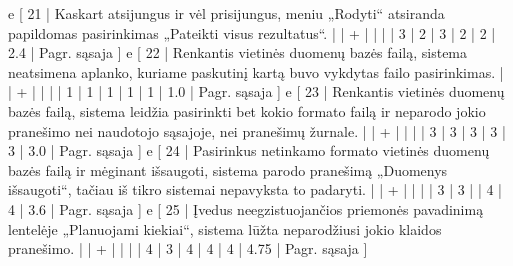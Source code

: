 {%
  e [ 21 | Kaskart atsijungus ir vėl prisijungus, meniu „Rodyti“ atsiranda papildomas
  pasirinkimas „Pateikti visus rezultatus“.
                    |   | + |   |   |   | 3 | 2 | 3 | 2 | 2 | 2.4  | Pagr. sąsaja ]
  e [ 22 | Renkantis vietinės duomenų bazės failą, sistema neatsimena aplanko,
  kuriame paskutinį kartą buvo vykdytas failo pasirinkimas.
                    |   | + |   |   |   | 1 | 1 | 1 | 1 | 1 | 1.0  | Pagr. sąsaja ]
  e [ 23 | Renkantis vietinės duomenų bazės failą, sistema leidžia pasirinkti
  bet kokio formato failą ir neparodo jokio pranešimo nei naudotojo sąsajoje,
  nei pranešimų žurnale.
                    |   | + |   |   |   | 3 | 3 | 3 | 3 | 3 | 3.0  | Pagr. sąsaja ]
  e [ 24 | Pasirinkus netinkamo formato vietinės duomenų bazės failą ir mėginant
  išsaugoti, sistema parodo pranešimą „Duomenys išsaugoti“, tačiau iš tikro sistemai
  nepavyksta to padaryti.
                    |   | + |   |   |   | 3 | 3 |   | 4 | 4 | 3.6  | Pagr. sąsaja ]
  e [ 25 | Įvedus neegzistuojančios priemonės pavadinimą lentelėje „Planuojami kiekiai“,
  sistema lūžta neparodžiusi jokio klaidos pranešimo.
                    |   | + |   |   |   | 4 | 3 | 4 | 4 | 4 | 4.75 | Pagr. sąsaja ]
}
